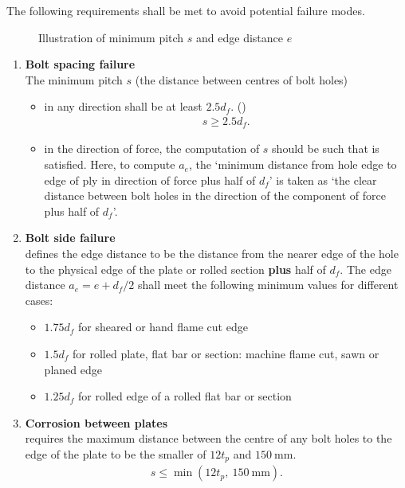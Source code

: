 The following requirements shall be met to avoid potential failure modes.
\begin{figure}[H]
\centering\caption{Illustration of minimum pitch $s$ and edge distance $e$}
\end{figure}
\begin{enumerate}
\item \textbf{Bolt spacing failure}\\
The minimum pitch $s$ (the distance between centres of bolt holes)
\begin{itemize}
\item in any direction shall be at least $2.5d_f$. ()
\begin{gather}
s\geqslant2.5d_f.
\end{gather}
\item in the direction of force, the computation of $s$ should be such that  is satisfied. Here, to compute $a_e$, the `minimum distance from hole edge to edge of ply in direction of force plus half of $d_f$' is taken as `the clear distance between bolt holes in the direction of the component of force plus half of $d_f$'.
\end{itemize}
\item \textbf{Bolt side failure}\\
 defines the edge distance to be the distance from the nearer edge of the hole to the physical edge of the plate or rolled section \textbf{plus} half of $d_f$. The edge distance $a_e=e+d_f/2$ shall meet the following minimum values for different cases:
\begin{itemize}
\item $1.75d_f$ for sheared or hand flame cut edge
\item $1.5d_f$ for rolled plate, flat bar or section: machine flame cut, sawn or planed edge
\item $1.25d_f$ for rolled edge of a rolled flat bar or section
\end{itemize}
\item \textbf{Corrosion between plates}\\
 requires the maximum distance between the centre of any bolt holes to the edge of the plate to be the smaller of $12t_p$ and $\SI{150}{\mm}$.
\begin{gather}
s\leqslant\min\left(12t_p,~\SI{150}{\mm}\right).
\end{gather}
\end{enumerate}
